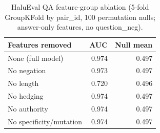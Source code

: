 \begin{table}[t]
\centering
\caption{HaluEval QA feature-group ablation (5-fold GroupKFold by pair_id, 100 permutation nulls; answer-only features, no question\_neg).}
\label{tab:halueval_ablation}
\begin{tabular}{lrr}
\toprule
Features removed & AUC & Null mean \\
\midrule
None (full model) & 0.974 & 0.497 \\
No negation & 0.973 & 0.497 \\
No length & 0.720 & 0.496 \\
No hedging & 0.974 & 0.497 \\
No authority & 0.974 & 0.497 \\
No specificity/mutation & 0.974 & 0.497 \\
\bottomrule
\end{tabular}
\end{table}
